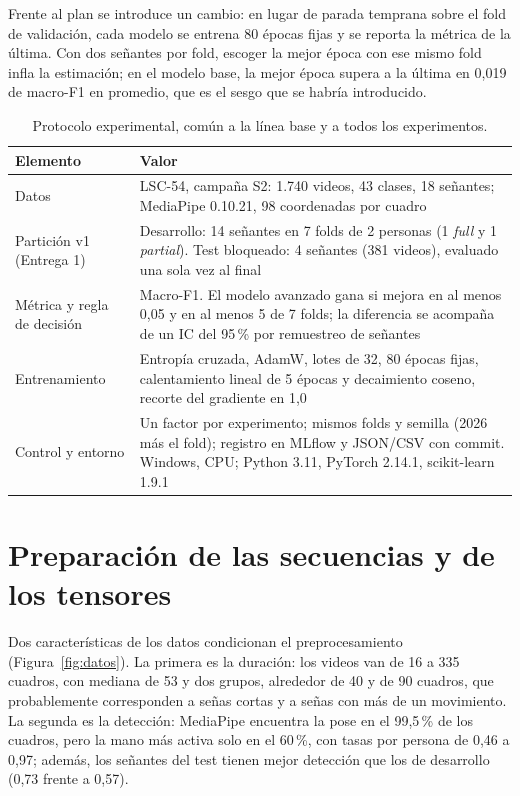 \documentclass[11pt,a4paper]{article}
\begin{document}
Frente al plan se introduce un cambio: en lugar de parada temprana sobre el fold de validación, cada modelo se entrena 80 épocas fijas y se reporta la métrica de la última. Con dos señantes por fold, escoger la mejor época con ese mismo fold infla la estimación; en el modelo base, la mejor época supera a la última en 0,019 de macro-F1 en promedio, que es el sesgo que se habría introducido.

\begin{table}[htbp]
\centering
\caption{Protocolo experimental, común a la línea base y a todos los experimentos.}\label{tab:protocolo}
\small
\renewcommand{\arraystretch}{1.1}
\begin{tabularx}{\textwidth}{@{}>{\raggedright\arraybackslash}p{3.4cm}Y@{}}
\toprule
\textbf{Elemento} & \textbf{Valor}\\
\midrule
Datos & LSC-54, campaña S2: 1.740 videos, 43 clases, 18 señantes; MediaPipe 0.10.21, 98 coordenadas por cuadro\\
Partición v1 (Entrega 1) & Desarrollo: 14 señantes en 7 folds de 2 personas (1 \emph{full} y 1 \emph{partial}). Test bloqueado: 4 señantes (381 videos), evaluado una sola vez al final\\
Métrica y regla de decisión & Macro-F1. El modelo avanzado gana si mejora en al menos 0,05 y en al menos 5 de 7 folds; la diferencia se acompaña de un IC del 95\,\% por remuestreo de señantes\\
Entrenamiento & Entropía cruzada, AdamW, lotes de 32, 80 épocas fijas, calentamiento lineal de 5 épocas y decaimiento coseno, recorte del gradiente en 1,0\\
Control y entorno & Un factor por experimento; mismos folds y semilla (2026 más el fold); registro en MLflow y JSON/CSV con commit. Windows, CPU; Python 3.11, PyTorch 2.14.1, scikit-learn 1.9.1\\
\bottomrule
\end{tabularx}
\end{table}

\section{Preparación de las secuencias y de los tensores}

Dos características de los datos condicionan el preprocesamiento (Figura~\ref{fig:datos}). La primera es la duración: los videos van de 16 a 335 cuadros, con mediana de 53 y dos grupos, alrededor de 40 y de 90 cuadros, que probablemente corresponden a señas cortas y a señas con más de un movimiento. La segunda es la detección: MediaPipe encuentra la pose en el 99,5\,\% de los cuadros, pero la mano más activa solo en el 60\,\%, con tasas por persona de 0,46 a 0,97; además, los señantes del test tienen mejor detección que los de desarrollo (0,73 frente a 0,57).
\end{document}
